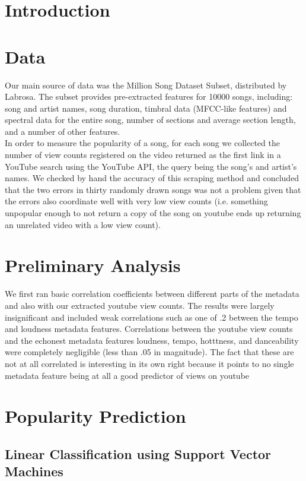 \documentclass[12pt]{amsart}
\begin{document}
\begin{multicols}{2}

\section{Introduction}

\section{Data}
Our main source of data was the Million Song Dataset Subset, distributed by Labrosa. The subset provides pre-extracted features for 10000 songs, including: song and artist names, song duration, timbral data (MFCC-like features) and spectral data for the entire song, number of sections and average section length, and a number of other features.
\\ In order to measure the popularity of a song, for each song we collected the number of view counts registered on the video returned as the first link in a YouTube search using the YouTube API, the query being the song's and artist's names.  We checked by hand the accuracy
of this scraping method and concluded that the two errors in thirty randomly drawn songs
was not a problem given that the errors also coordinate well with very low view counts (i.e.
something unpopular enough to not return a copy of the song on youtube ends up returning
an unrelated video with a low view count).
\section{Preliminary Analysis}
 We first ran basic correlation coefficients between different parts of the metadata and also with our extracted youtube view counts. The results were largely insignificant and included weak correlations such as one of .2 between the tempo and loudness metadata features. Correlations between the youtube view counts and the echonest metadata features loudness, tempo, hotttness, and danceability were completely negligible (less than .05 in magnitude). The fact that these are not at all correlated is interesting in its own right because it points to no single metadata feature being at all a good predictor of views on youtube
\section {Popularity Prediction}

\subsection{Linear Classification using Support Vector Machines}

\end{multicols}
\end{document}
